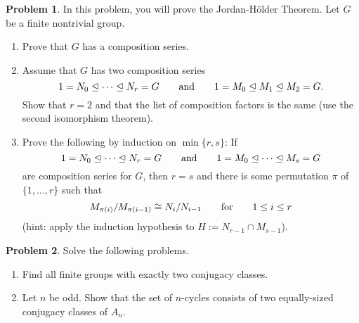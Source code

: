 \documentclass[letterpaper,11pt]{amsart}
\theoremstyle{plain}
\theoremstyle{definition}
\newtheorem{pr}{Problem}
\theoremstyle{remark}
\begin{document}
\begin{pr}
    In this problem, you will prove the Jordan-H\"older Theorem.
    Let $G$ be a finite nontrivial group.
    \begin{enumerate}
        \item Prove that $G$ has a composition series.
        \item Assume that $G$ has two composition series
        \[
            1 = N_0 \trianglelefteq \dots \trianglelefteq N_r = G \qquad {\rm and} \qquad 1 = M_0 \trianglelefteq M_1 \trianglelefteq M_2 = G.
        \]
        Show that $r = 2$ and that the list of composition factors is the same (use the second isomorphism theorem).
        \item Prove the following by induction on $\min\{r,s\}$: If
                \[
            1 = N_0 \trianglelefteq \dots \trianglelefteq N_r = G \qquad {\rm and} \qquad 1 = M_0 \trianglelefteq \dots \trianglelefteq M_s = G
        \]
        are composition series for $G$, then $r = s$ and there is some permutation $\pi$ of $\{1,\dots,r\}$ such that
        \[
            M_{\pi(i)} / M_{\pi(i-1)} \cong N_{i} / N_{i-1} \qquad {\rm for} \qquad 1 \le i \le r
        \]
        (hint: apply the induction hypothesis to $H := N_{r-1} \cap M_{s-1}$).
    \end{enumerate}
\end{pr}

\begin{pr}
    Solve the following problems.
    \begin{enumerate}
        \item Find all finite groups with exactly two conjugacy classes.
        \item Let $n$ be odd.
        Show that the set of $n$-cycles consists of two equally-sized conjugacy classes of $A_n$.
    \end{enumerate}
\end{pr}
\end{document}
